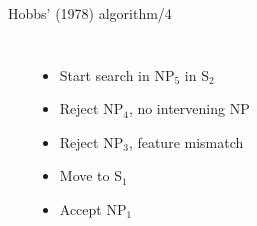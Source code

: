 \documentclass[dvipsnames, 10pt, compress]{beamer}
\begin{document}
\begin{frame}{Hobbs' (1978) algorithm/4}

\begin{columns}

~\\
~\\
\begin{itemize}
   \item Start search in NP$_5$ in S$_2$
   \item Reject NP$_4$, no intervening NP
   \item Reject NP$_3$, feature mismatch
   \item Move to S$_1$
   \item Accept NP$_1$
\end{itemize}
\end{columns}

\end{frame}
\end{document}
